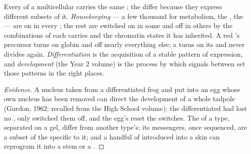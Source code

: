 \begin{proposition}\label{prop:b1:expression-control:differentiation}
Every  of a multicellular  carries the same ; the
 differ because they express different subsets of it.
\emph{Housekeeping}  --- a few thousand for metabolism, the
, the  --- are on in every ; the rest are
switched on in some  and off in others by the combinations of
 each  carries and the chromatin states it
has inherited. A red 's precursor turns on globin and off nearly
everything else; a  turns on its  and never divides
again. \emph{Differentiation} is the acquisition of a stable pattern
of expression, and \emph{development} (the Year 2 volume) is the
process by which signals between  set those patterns in the
right places.
\end{proposition}
\begin{proof}[Evidence]
A nucleus taken from a differentiated frog  and put into an egg
whose own nucleus has been removed can direct the development of a
whole tadpole (Gurdon, 1962; recalled from the High School volume): the
differentiated  had lost no , only switched them off, and the
egg's  reset the switches. The  of a  type,
separated on a gel, differ from another type's; its messengers, once
sequenced, are a subset of the  specific to it; and a handful of
 introduced into a skin  can reprogram it
into a stem  or a .
\end{proof}

